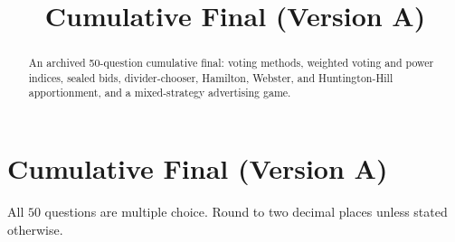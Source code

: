 \documentclass[12pt]{ximera}
\title{Cumulative Final (Version A)}
\begin{document}
\begin{abstract}
An archived 50-question cumulative final: voting methods, weighted voting and power indices, sealed bids, divider-chooser, Hamilton, Webster, and Huntington-Hill apportionment, and a mixed-strategy advertising game.
\end{abstract}
\maketitle

\section*{Cumulative Final (Version A)}

All $50$ questions are multiple choice. Round to two decimal places unless stated otherwise.
\end{document}
